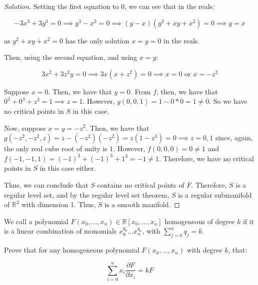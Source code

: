 \documentclass[10pt]{article}
\newenvironment{problem}[2][]{\begin{trivlist}
\item[\hskip \labelsep {\bfseries #1}\hskip \labelsep {\bfseries #2.}]}{\end{trivlist}}
\begin{document}
\begin{proof}[Solution]
Setting the first equation to 0, we can see that in the reals:

$$ -3x^3 + 3y^3  = 0 \implies y^3 - x^3 = 0 \implies (y-x)(y^2 + xy + x^2) = 0 \implies y = x$$

as $y^2 + xy + x^2 = 0$ has the only solution $x = y = 0$ in the reals. 

Then, using the second equation, and using $x = y$:

$$  3x^2 + 3z^2y = 0 \implies 3x(x + z^2) = 0 \implies x = 0 \text{ or } x = -z^2 $$

Suppose $x = 0$. Then, we have that $y = 0$. From $f$, then, we have that $0^3 + 0^3 + z^3 = 1 \implies z = 1$. However, $g(0,0,1)  = 1 - 0*0 = 1 \not = 0$. So we have no critical points in $S$ in this case.

Now, suppose $x = y = -z^2$. Then, we have that $g(-z^2, -z^2, z) = z - (-z^2)(-z^2) = z(1-z^3) = 0 \implies z = 0, 1$ since, again, the only real cube root of unity is $1$. However, $f(0,0,0)  = 0 \not = 1$ and $f(-1,-1,1) = (-1)^3 + (-1)^3 + 1^3 = -1 \not = 1$. Therefore, we have no critical points in $S$ in this case either.

Thus, we can conclude that $S$ contains no critical points of $F$. Therefore, $S$ is a regular level set, and by the regular level set theorem, $S$ is a regular submanifold of $\mathbb{R}^3$ with dimension 1. Thus, $S$ is a smooth manifold.

\end{proof}

\begin{problem}{Question 2}

We call a polynomial $F(x_0,...,x_n) \in \mathbb{R}[x_0,...,x_n]$ homogeneous of degree $k$ if it is a linear combination of monomials $x_0^{q_0}...x_n^{q_n}$, with $\sum_{j=0}^n q_j = k$. 

Prove that for any homogeneous polynomial $F(x_0,...,x_n)$ with degree $k$, that:

$$ \sum_{i=0}^n x_i \frac{\partial F}{\partial x_i} = kF $$

\end{problem}
\end{document}
